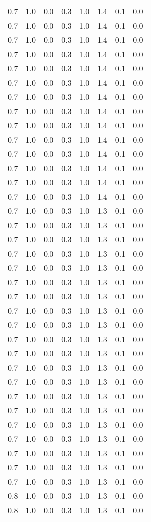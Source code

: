 \begin{tabular}{L{1in}|L{1in}|L{1in}|L{1in}|L{1in}|L{1in}|L{1in}|L{1in}}
0.7&1.0&0.0&0.3&1.0&1.4&0.1&0.0\\
0.7&1.0&0.0&0.3&1.0&1.4&0.1&0.0\\
0.7&1.0&0.0&0.3&1.0&1.4&0.1&0.0\\
0.7&1.0&0.0&0.3&1.0&1.4&0.1&0.0\\
0.7&1.0&0.0&0.3&1.0&1.4&0.1&0.0\\
0.7&1.0&0.0&0.3&1.0&1.4&0.1&0.0\\
0.7&1.0&0.0&0.3&1.0&1.4&0.1&0.0\\
0.7&1.0&0.0&0.3&1.0&1.4&0.1&0.0\\
0.7&1.0&0.0&0.3&1.0&1.4&0.1&0.0\\
0.7&1.0&0.0&0.3&1.0&1.4&0.1&0.0\\
0.7&1.0&0.0&0.3&1.0&1.4&0.1&0.0\\
0.7&1.0&0.0&0.3&1.0&1.4&0.1&0.0\\
0.7&1.0&0.0&0.3&1.0&1.4&0.1&0.0\\
0.7&1.0&0.0&0.3&1.0&1.4&0.1&0.0\\
0.7&1.0&0.0&0.3&1.0&1.3&0.1&0.0\\
0.7&1.0&0.0&0.3&1.0&1.3&0.1&0.0\\
0.7&1.0&0.0&0.3&1.0&1.3&0.1&0.0\\
0.7&1.0&0.0&0.3&1.0&1.3&0.1&0.0\\
0.7&1.0&0.0&0.3&1.0&1.3&0.1&0.0\\
0.7&1.0&0.0&0.3&1.0&1.3&0.1&0.0\\
0.7&1.0&0.0&0.3&1.0&1.3&0.1&0.0\\
0.7&1.0&0.0&0.3&1.0&1.3&0.1&0.0\\
0.7&1.0&0.0&0.3&1.0&1.3&0.1&0.0\\
0.7&1.0&0.0&0.3&1.0&1.3&0.1&0.0\\
0.7&1.0&0.0&0.3&1.0&1.3&0.1&0.0\\
0.7&1.0&0.0&0.3&1.0&1.3&0.1&0.0\\
0.7&1.0&0.0&0.3&1.0&1.3&0.1&0.0\\
0.7&1.0&0.0&0.3&1.0&1.3&0.1&0.0\\
0.7&1.0&0.0&0.3&1.0&1.3&0.1&0.0\\
0.7&1.0&0.0&0.3&1.0&1.3&0.1&0.0\\
0.7&1.0&0.0&0.3&1.0&1.3&0.1&0.0\\
0.7&1.0&0.0&0.3&1.0&1.3&0.1&0.0\\
0.7&1.0&0.0&0.3&1.0&1.3&0.1&0.0\\
0.7&1.0&0.0&0.3&1.0&1.3&0.1&0.0\\
0.8&1.0&0.0&0.3&1.0&1.3&0.1&0.0\\
0.8&1.0&0.0&0.3&1.0&1.3&0.1&0.0\\

\end{tabular}
